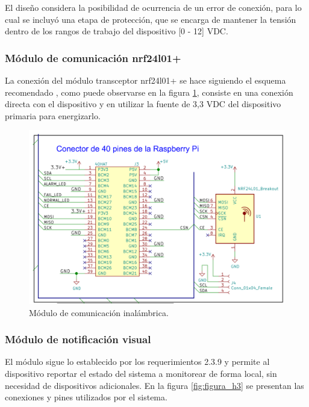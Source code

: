 El diseño considera la posibilidad de ocurrencia de un error de conexión, para lo cual se incluyó una etapa de protección, que se encarga de mantener la tensión dentro de los rangos de trabajo del dispositivo [0 - 12] VDC.

\subsubsection{Módulo de comunicación nrf24l01+}

La conexión del módulo transceptor nrf24l01+ se hace siguiendo el esquema recomendado \cite{rf24}, como puede observarse en la figura \ref{fig:figura_g3}, consiste en una conexión directa con el dispositivo y en utilizar la fuente de 3,3 VDC del dispositivo primaria para energizarlo.  

\begin{figure}[]
	\centering
	\includegraphics[scale=.35]{./Figures/Capitulo3/Fig_G3.png}
	\caption{Módulo de comunicación inalámbrica.}
	\label{fig:figura_g3}
\end{figure} 

\subsubsection{Módulo de notificación visual}

El módulo sigue lo establecido por los requerimientos  2.3.9 y permite al dispositivo reportar el estado del sistema a monitorear de forma local, sin necesidad de dispositivos adicionales. En la figura \ref{fig:figura_h3} se presentan las conexiones y pines utilizados por el sistema.

